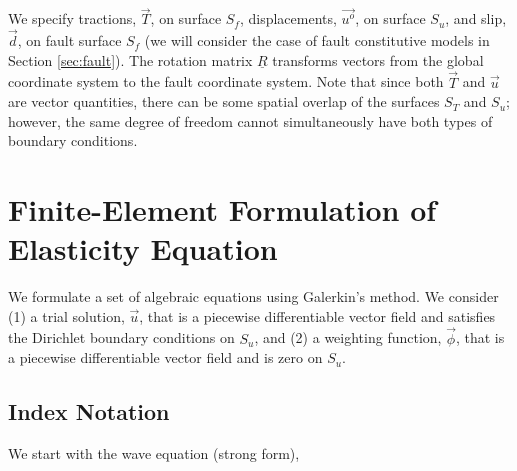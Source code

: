 We specify tractions, $\vec{T}$, on surface $S_{f}$, displacements,
$\overrightarrow{u^{o}}$, on surface $S_{u}$, and slip, $\vec{d}$,
on fault surface $S_{f}$ (we will consider the case of fault constitutive
models in Section \vref{sec:fault}). The rotation matrix $\underline{R}$
transforms vectors from the global coordinate system to the fault
coordinate system. Note that since both $\overrightarrow{T}$ and
$\overrightarrow{u}$ are vector quantities, there can be some spatial
overlap of the surfaces $S_{T}$ and $S_{u}$; however, the same degree
of freedom cannot simultaneously have both types of boundary conditions.


\section{Finite-Element Formulation of Elasticity Equation}

We formulate a set of algebraic equations using Galerkin's method.
We consider (1) a trial solution, $\vec{u}$, that is a piecewise
differentiable vector field and satisfies the Dirichlet boundary conditions
on $S_{u}$, and (2) a weighting function, $\vec{\phi}$, that is
a piecewise differentiable vector field and is zero on $S_{u}$.


\subsection{Index Notation}

We start with the wave equation (strong form),

